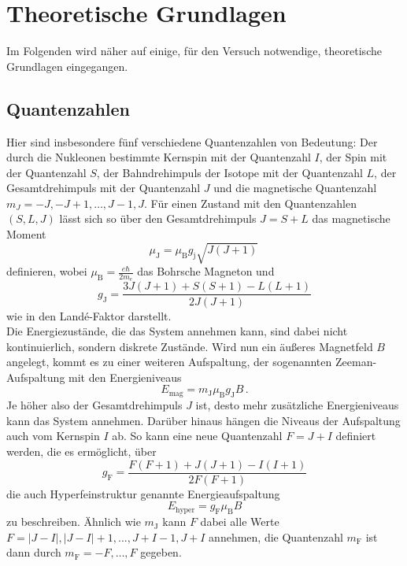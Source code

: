 \section{Theoretische Grundlagen}
\label{sec:theorie}

Im Folgenden wird näher auf einige, für den Versuch notwendige, theoretische Grundlagen eingegangen.

\subsection{Quantenzahlen}

Hier sind insbesondere fünf verschiedene Quantenzahlen von Bedeutung:
Der durch die Nukleonen bestimmte Kernspin mit der Quantenzahl $I$, der Spin mit der Quantenzahl $S$, der Bahndrehimpuls der Isotope mit der Quantenzahl $L$, der Gesamtdrehimpuls mit der Quantenzahl $J$ und die magnetische Quantenzahl $m_J = -J, -J+1, \dots, J-1, J$.
Für einen Zustand mit den Quantenzahlen $(S,L,J)$ lässt sich so über den Gesamtdrehimpuls $J = S + L$ das magnetische Moment
\begin{equation}
    \mu_\text{J} = \mu_\text{B} g_\text{j} \sqrt{J (J + 1)} \,
    \label{eq:magmom}
\end{equation}
definieren, wobei $\mu_\text{B} = \frac{e \hbar}{2 m_e}$ das Bohrsche Magneton und
\begin{equation}
    g_\text{J} = \frac{3 J(J + 1) + S(S + 1) - L(L + 1)}{2 J(J + 1)}
    \label{eq:landefak}
\end{equation}
wie in \cite{Pfeiler2017} den Landé-Faktor darstellt. \\

Die Energiezustände, die das System annehmen kann, sind dabei nicht kontinuierlich, sondern diskrete Zustände.
Wird nun ein äußeres Magnetfeld $B$ angelegt, kommt es zu einer weiteren Aufspaltung, der sogenannten Zeeman-Aufspaltung mit den Energieniveaus
\begin{equation}
    E_\text{mag} = m_\text{J} \mu_\text{B} g_\text{J} B \,.
\end{equation}
Je höher also der Gesamtdrehimpuls $J$ ist, desto mehr zusätzliche Energieniveaus kann das System annehmen.
Darüber hinaus hängen die Niveaus der Aufspaltung auch vom Kernspin $I$ ab.
So kann eine neue Quantenzahl $F = J + I$ definiert werden, die es ermöglicht, über
\begin{equation}
    g_\text{F} = \frac{ F(F + 1) + J(J + 1) - I(I + 1)}{2 F(F + 1)}
    \label{eq:FLande}
\end{equation}
die auch Hyperfeinstruktur genannte Energieaufspaltung
\begin{equation}
    E_\text{hyper} = g_\text{F} \mu_\text{B} B
    \label{eq:hyperfein}
\end{equation}
zu beschreiben.
Ähnlich wie $m_\text{J}$ kann $F$ dabei alle Werte $F = |J - I|,|J-I|+1,...,J+I-1, J + I$ annehmen, die Quantenzahl $m_\text{F}$ ist dann durch $m_\text{F} = -F,\dots, F$ gegeben.

